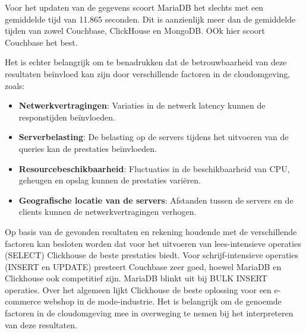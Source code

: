 Voor het updaten van de gegevens scoort MariaDB het slechts met een gemiddelde tijd van 11.865 seconden. Dit is aanzienlijk meer dan de gemiddelde tijden van zowel Couchbase, ClickHouse en MongoDB. OOk hier scoort Couchbase het best. 

\vspace{5mm}

Het is echter belangrijk om te benadrukken dat de betrouwbaarheid van deze resultaten beïnvloed kan zijn door verschillende factoren in de cloudomgeving, zoals:
\begin{itemize}
    \item \textbf{Netwerkvertragingen}: Variaties in de netwerk latency kunnen de responstijden beïnvloeden.
    \item \textbf{Serverbelasting}: De belasting op de servers tijdens het uitvoeren van de queries kan de prestaties beïnvloeden.
    \item \textbf{Resourcebeschikbaarheid}: Fluctuaties in de beschikbaarheid van CPU, geheugen en opslag kunnen de prestaties variëren.
    \item \textbf{Geografische locatie van de servers}: Afstanden tussen de servers en de clients kunnen de netwerkvertragingen verhogen.
\end{itemize}

\vspace{5mm}

Op basis van de gevonden resultaten en rekening houdende met de verschillende factoren kan besloten worden dat voor het uitvoeren van lees-intensieve operaties (SELECT) Clickhouse de beste prestaties biedt. Voor schrijf-intensieve operaties (INSERT en UPDATE) presteert Couchbase zeer goed, hoewel MariaDB en Clickhouse ook competitief zijn. MariaDB blinkt uit bij BULK INSERT operaties. Over het algemeen lijkt Clickhouse de beste oplossing voor een e-commerce webshop in de mode-industrie. Het is belangrijk om de genoemde factoren in de cloudomgeving mee in overweging te nemen bij het interpreteren van deze resultaten.